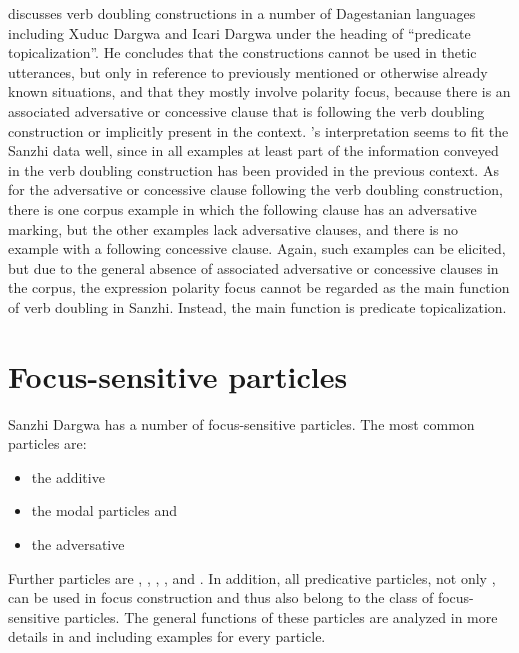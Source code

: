 \citet{Maisak2010} discusses verb doubling constructions in a number of Dagestanian languages including Xuduc Dargwa and Icari Dargwa under the heading of ``predicate topicalization''. He concludes that the constructions cannot be used in thetic utterances, but only in reference to previously mentioned or otherwise already known situations, and that they mostly involve polarity focus, because there is an associated adversative or concessive clause that is following the verb doubling construction or implicitly present in the context. 's interpretation seems to fit the Sanzhi data well, since in all examples at least part of the information conveyed in the verb doubling construction has been provided in the previous context. As for the adversative or concessive clause following the verb doubling construction, there is one corpus example in which the following clause has an adversative  marking, but the other examples  lack adversative clauses, and there is no example with a following concessive clause. Again, such examples can be elicited, but due to the general absence of associated adversative or concessive clauses in the corpus, the expression polarity focus cannot be regarded as the main function of verb doubling in Sanzhi. Instead, the main function is predicate topicalization.



\section{Focus-sensitive particles}
\label{sec:Focus-sensitive particles}

Sanzhi Dargwa has a number of focus-sensitive particles. The most common particles are:
%
\begin{itemize}
	\item	the additive  
	\item	the modal particles  and 
	\item	the adversative  
\end{itemize}

Further particles are  ,  ,  ,  , and  . In addition, all predicative particles, not only , can be used in focus construction and thus also belong to the class of focus-sensitive particles. The general functions of these particles are analyzed in more details in  and  including examples for every particle.

